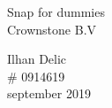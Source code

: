 \documentclass{article}
\begin{document}
\begin{titlepage}
		\begin{center}%
		{\huge{Snap for dummies}}\\ %
		[2cm]
		{\large Crownstone B.V }\\
		[15cm]
		\end{center} 
		\begin{flushright}
		{\large Ilhan Delic \\}
		\# 0914619 \\
		september 2019 \\
		\end{flushright}	
\end{titlepage}

\tableofcontents
\thispagestyle{empty}
\cleardoublepage %

\end{document}
